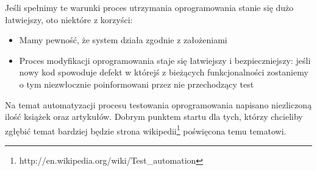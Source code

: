         Jeśli spełnimy te warunki proces utrzymania oprogramowania stanie się dużo łatwiejszy, oto niektóre z korzyści:
        
         \begin{itemize}
     	    \item Mamy pewność, że system działa zgodnie z założeniami
     	    \item Proces modyfikacji oprogramowania staje się łatwiejszy i bezpieczniejszy: jeśli nowy kod spowoduje defekt w którejś z bieżących funkcjonalności zostaniemy o tym niezwłocznie poinformowani przez nie przechodzący test
     	  \end{itemize}
     	  
     	  Na temat automatyzacji procesu testowania oprogramowania napisano niezliczoną ilość książek oraz artykułów. Dobrym punktem startu dla tych, którzy chcieliby zgłębić temat bardziej będzie strona wikipedii\footnote{http://en.wikipedia.org/wiki/Test\_automation} \nocite{wiki_test_automation} poświęcona temu tematowi.

